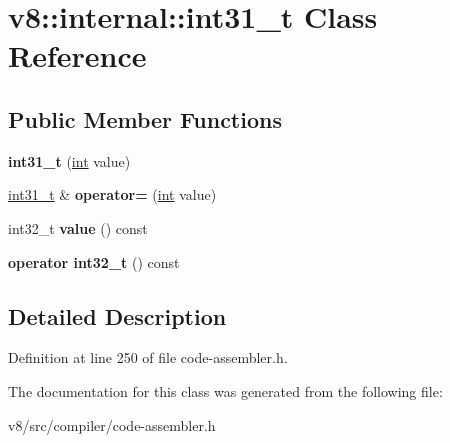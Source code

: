 \hypertarget{classv8_1_1internal_1_1int31__t}{}\section{v8\+:\+:internal\+:\+:int31\+\_\+t Class Reference}
\label{classv8_1_1internal_1_1int31__t}
\subsection*{Public Member Functions}
\begin{DoxyCompactItemize}
\item 
\mbox{\label{classv8_1_1internal_1_1int31__t_a456920867b7afcce693a9b38e87a2d59}} 
{\bfseries int31\+\_\+t} (\mbox{\hyperlink{classint}{int}} value)
\item 
\mbox{\label{classv8_1_1internal_1_1int31__t_ac42f2b706d87c75f8864114192c59d52}} 
\mbox{\hyperlink{classv8_1_1internal_1_1int31__t}{int31\+\_\+t}} \& {\bfseries operator=} (\mbox{\hyperlink{classint}{int}} value)
\item 
\mbox{\label{classv8_1_1internal_1_1int31__t_ad1683f3b15db8f05e7ac2782e60fde60}} 
int32\+\_\+t {\bfseries value} () const
\item 
\mbox{\label{classv8_1_1internal_1_1int31__t_ad4fd4712538f639121249e1a454133da}} 
{\bfseries operator int32\+\_\+t} () const
\end{DoxyCompactItemize}


\subsection{Detailed Description}


Definition at line 250 of file code-\/assembler.\+h.



The documentation for this class was generated from the following file\+:\begin{DoxyCompactItemize}
\item 
v8/src/compiler/code-\/assembler.\+h\end{DoxyCompactItemize}
